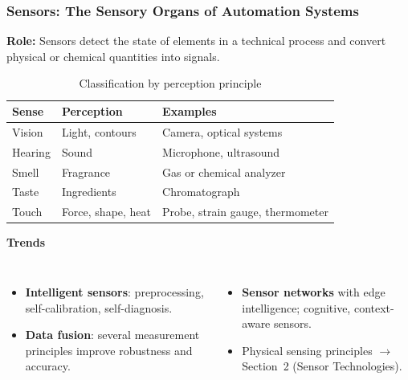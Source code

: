 \begin{frame}
	\frametitle{Sensors: The Sensory Organs of Automation Systems}
	\textbf{Role:} Sensors detect the state of elements in a technical process and convert physical or chemical quantities into signals.
	\begin{table}
		\centering
		\footnotesize
		\begin{tabular}{lll}
			\toprule
			\textbf{Sense} & \textbf{Perception} & \textbf{Examples} \\
			\midrule
			Vision  & Light, contours    & Camera, optical systems \\
			Hearing & Sound              & Microphone, ultrasound \\
			Smell   & Fragrance          & Gas or chemical analyzer \\
			Taste   & Ingredients        & Chromatograph \\
			Touch   & Force, shape, heat & Probe, strain gauge, thermometer \\
			\bottomrule
		\end{tabular}
		\caption{Classification by perception principle}
	\end{table}
	\small
	\vspace{-2mm}
	\textbf{Trends}
	\begin{columns}[T,onlytextwidth]
		\begin{itemize}
			\item \textbf{Intelligent sensors}: preprocessing, self-calibration, self-diagnosis.
			\item \textbf{Data fusion}: several measurement principles improve robustness and accuracy.
		\end{itemize}
		\begin{itemize}
			\item \textbf{Sensor networks} with edge intelligence; cognitive, context-aware sensors.
			\item Physical sensing principles $\rightarrow$ Section~2 (Sensor Technologies).
		\end{itemize}
	\end{columns}
\end{frame}

